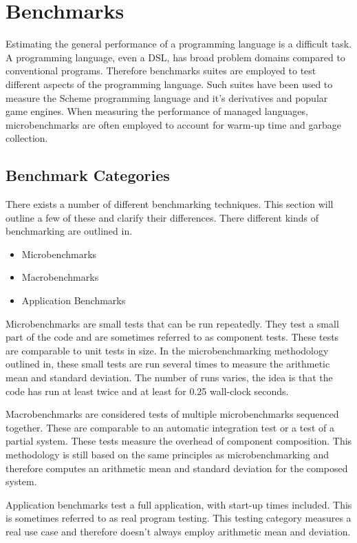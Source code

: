 \section{Benchmarks}
Estimating the general performance of a programming language is a difficult task. A programming language, even a \gls{DSL}, has broad problem domains compared to conventional programs. Therefore benchmarks suites are employed to test different aspects of the programming language. Such suites have been used to measure the Scheme programming language and it's derivatives \cite{bauman2015pycket, strickland2012chaperones} and popular game engines\cite{p92018gameplay}. When measuring the performance of managed languages, microbenchmarks are often employed to account for warm-up time and garbage collection\cite{sestoft2013microbenchmarks}.

\subsection{Benchmark Categories}
There exists a number of different benchmarking techniques. This section will outline a few of these and clarify their differences. There different kinds of benchmarking are outlined in\cite{p92018gameplay}.
\begin{itemize}
  \item Microbenchmarks
  \item Macrobenchmarks
  \item Application Benchmarks
\end{itemize}

Microbenchmarks are small tests that can be run repeatedly. They test a small part of the code and are sometimes referred to as component tests. These tests are comparable to unit tests in size. In the microbenchmarking methodology outlined in\cite{sestoft2013microbenchmarks}, these small tests are run several times to measure the arithmetic mean and standard deviation. The number of runs varies, the idea is that the code has run at least twice and at least for 0.25 wall-clock seconds.

Macrobenchmarks are considered tests of multiple microbenchmarks sequenced together. These are comparable to an automatic integration test or a test of a partial system. These tests measure the overhead of component composition. This methodology is still based on the same principles as microbenchmarking and therefore computes an arithmetic mean and standard deviation for the composed system.

Application benchmarks test a full application, with start-up times included. This is sometimes referred to as real program testing. This testing category measures a real use case and therefore doesn't always employ arithmetic mean and deviation.

